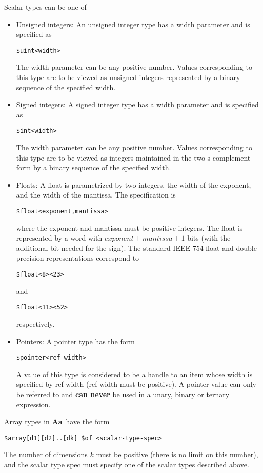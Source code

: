 \documentclass{article}
\newcommand{\Aa}{{\bf Aa}~}
\begin{document}
Scalar types can be one of 
\begin{itemize}
\item Unsigned integers:  An unsigned integer type
has a width parameter and is specified as 
\begin{verbatim}
$uint<width>
\end{verbatim}
The width parameter can be any positive number.
Values corresponding to this type are to be
viewed as unsigned integers represented by 
a binary sequence of the specified width.
\item Signed integers:  A signed integer type
has a width parameter and is specified as 
\begin{verbatim}
$int<width>
\end{verbatim}
The width parameter can be any positive number.
Values corresponding to this type are to be
viewed as integers maintained in the
two-s complement form  by 
a binary sequence of the specified width.
\item Floats: A float is parametrized by
two integers, the width of the exponent,
and the width of the mantissa.  
The specification is
\begin{verbatim}
$float<exponent,mantissa>
\end{verbatim}
where the exponent and mantissa must be positive
integers.  The float is represented by 
a word with $exponent+mantissa+1$ bits
(with the additional bit needed for the sign).
The standard IEEE 754 float and double
precision representations correspond
to
\begin{verbatim}
$float<8><23> 
\end{verbatim}
and
\begin{verbatim}
$float<11><52> 
\end{verbatim}
respectively.
\item Pointers:  A pointer type has the form
\begin{verbatim}
$pointer<ref-width>
\end{verbatim}
A value of this type is considered to be
a handle to an item whose width is specified
by ref-width (ref-width must be positive).  
A pointer value can only be
referred to and {\bf can never} be used in a
unary, binary or ternary expression.
\end{itemize}


Array types in \Aa have the form
\begin{verbatim}
$array[d1][d2]..[dk] $of <scalar-type-spec>
\end{verbatim}
The number of dimensions $k$ must be positive (there is
no limit on this number), and the scalar type spec
must specify one of the scalar types described above.
\end{document}
